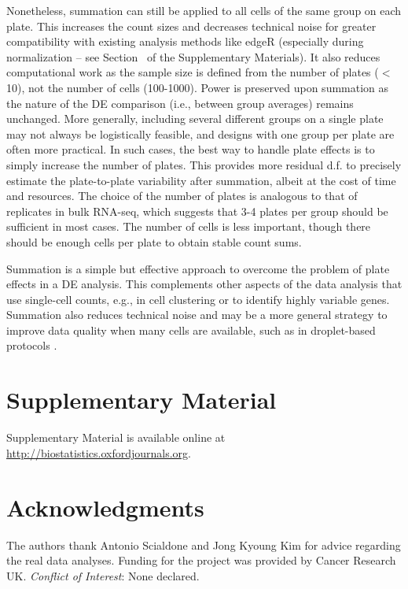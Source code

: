 \documentclass[oupdraft]{bio}
\begin{document}
Nonetheless, summation can still be applied to all cells of the same group on each plate.
This increases the count sizes and decreases technical noise for greater compatibility with existing analysis methods like edgeR
    (especially during normalization -- see Section~\suppnorm{} of the Supplementary Materials).
It also reduces computational work as the sample size is defined from the number of plates ($<$ 10), not the number of cells (100-1000).
Power is preserved upon summation as the nature of the DE comparison (i.e., between group averages) remains unchanged.
More generally, including several different groups on a single plate may not always be logistically feasible, and designs with one group per plate are often more practical.
In such cases, the best way to handle plate effects is to simply increase the number of plates.
This provides more residual d.f. to precisely estimate the plate-to-plate variability after summation, albeit at the cost of time and resources.
The choice of the number of plates is analogous to that of replicates in bulk RNA-seq, which suggests that 3-4 plates per group should be sufficient in most cases.
The number of cells is less important, though there should be enough cells per plate to obtain stable count sums.

Summation is a simple but effective approach to overcome the problem of plate effects in a DE analysis. 
This complements other aspects of the data analysis that use single-cell counts, e.g., in cell clustering or to identify highly variable genes.
Summation also reduces technical noise and may be a more general strategy to improve data quality when many cells are available,
    such as in droplet-based protocols \citep{klein2015droplet,macosko2015highly}.

\section{Supplementary Material}
Supplementary Material is available online at \href{http://biostatistics.oxfordjournals.org}{http://biostatistics.oxfordjournals.org}.

\section*{Acknowledgments}
The authors thank Antonio Scialdone and Jong Kyoung Kim for advice regarding the real data analyses.
Funding for the project was provided by Cancer Research UK.
{\it Conflict of Interest}: None declared.
\end{document}
